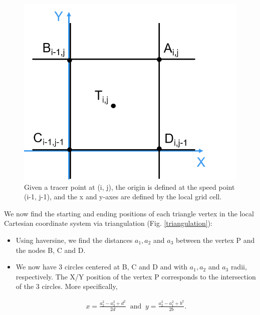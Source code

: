 \documentclass[draft]{agujournal2018}
\begin{document}
\begin{figure}[h]
 \begin{center}
   \includegraphics[scale=.6]{figures/localCS.png}
 \end{center}
 \caption{Given a tracer point at (i, j), the origin is defined at the speed point (i-1, j-1), and the x and y-axes are defined by the local grid cell.}
 \label{axes-locaux}
\end{figure}


We now find the starting and ending positions of each triangle vertex in the local Cartesian coordinate system via triangulation (Fig. \ref{triangulation}):

\begin{itemize}
    
    \item Using haversine, we find the distances $a_1, a_2$ and $a_3$ between the vertex P and the nodes B, C and D. 
    
    \item We now have 3 circles centered at B, C and D and with $a_1, a_2$ and $a_3$ radii, respectively. The X/Y position of the vertex P corresponds to the intersection of the 3 circles. More specifically,
    
\begin{align*}
    x = \frac{a_2^2-a_3^2+d^2}{2d} \;\; \text{and} \;\;
    y = \frac{a_2^2-a_1^2+b^2}{2b}.
\end{align*}
  
\end{itemize}
\end{document}
